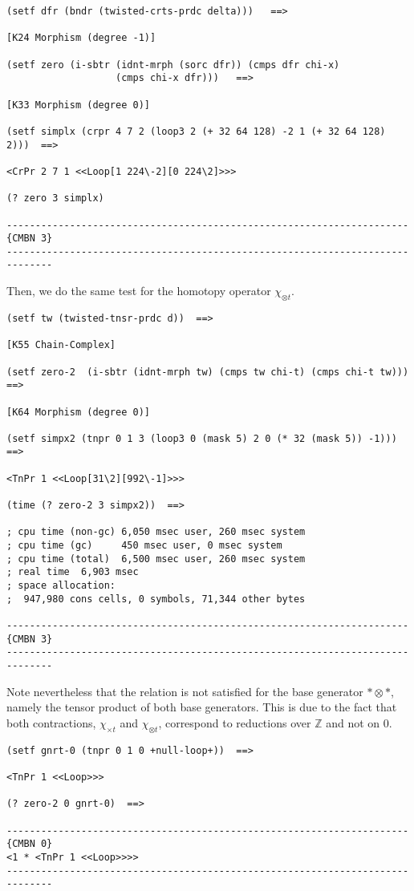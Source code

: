 {\footnotesize\begin{verbatim}
(setf dfr (bndr (twisted-crts-prdc delta)))   ==>

[K24 Morphism (degree -1)]

(setf zero (i-sbtr (idnt-mrph (sorc dfr)) (cmps dfr chi-x)
                   (cmps chi-x dfr)))   ==>

[K33 Morphism (degree 0)]

(setf simplx (crpr 4 7 2 (loop3 2 (+ 32 64 128) -2 1 (+ 32 64 128) 2)))  ==>

<CrPr 2 7 1 <<Loop[1 224\-2][0 224\2]>>>

(? zero 3 simplx)

----------------------------------------------------------------------{CMBN 3}
------------------------------------------------------------------------------
\end{verbatim}}
Then, we do the same test for the homotopy operator $\chi_{\otimes t}$.
{\footnotesize\begin{verbatim}
(setf tw (twisted-tnsr-prdc d))  ==>

[K55 Chain-Complex]

(setf zero-2  (i-sbtr (idnt-mrph tw) (cmps tw chi-t) (cmps chi-t tw)))  ==>

[K64 Morphism (degree 0)]

(setf simpx2 (tnpr 0 1 3 (loop3 0 (mask 5) 2 0 (* 32 (mask 5)) -1)))  ==>

<TnPr 1 <<Loop[31\2][992\-1]>>>

(time (? zero-2 3 simpx2))  ==>

; cpu time (non-gc) 6,050 msec user, 260 msec system
; cpu time (gc)     450 msec user, 0 msec system
; cpu time (total)  6,500 msec user, 260 msec system
; real time  6,903 msec
; space allocation:
;  947,980 cons cells, 0 symbols, 71,344 other bytes

----------------------------------------------------------------------{CMBN 3}
------------------------------------------------------------------------------
\end{verbatim}}
Note nevertheless that the relation is not satisfied for the base generator
$*\otimes *$, namely the tensor product of both base generators.
This is due to the fact that both contractions,  $\chi_{\times t}$ and  $\chi_{\otimes t}$,
correspond to  reductions over  $\mathbb{Z}$ and not on $0$.
{\footnotesize\begin{verbatim}
(setf gnrt-0 (tnpr 0 1 0 +null-loop+))  ==>

<TnPr 1 <<Loop>>>

(? zero-2 0 gnrt-0)  ==>

----------------------------------------------------------------------{CMBN 0}
<1 * <TnPr 1 <<Loop>>>>
------------------------------------------------------------------------------
\end{verbatim}}
